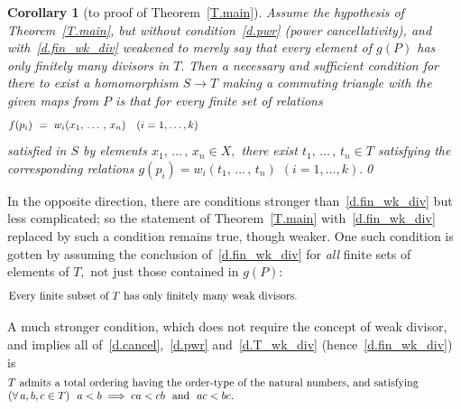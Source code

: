 \documentclass{amsart}
\newtheorem{corollary}[theorem]{Corollary}
\numberwithin{equation}{section}
\numberwithin{theorem}{section}
\newcommand{\2}{\mathbf{2}}
\begin{document}
\begin{corollary}[to proof of Theorem~\ref{T.main}]\label{C.varThm}
Assume the hypothesis of Theorem~\ref{T.main}, but without
condition~\eqref{d.pwr} {\rm(}power cancellativity{\rm)}, and
with~\eqref{d.fin_wk_div} weakened to
merely say that every element of $g(P)$ has only
finitely many divisors in $T.$
Then a necessary and sufficient condition
for there to exist a homomorphism $S\to T$ making a commuting
triangle with the given maps
from $P$ is that for every {\em finite set} of relations
%
\begin{equation}\begin{minipage}[c]{35pc}\label{d.fpi=wi}
$f(p_i)\ =\ w_i(x_1,\,\dots\,,\,x_n)$\hspace{1em}$(i=1,\dots,k)$
\end{minipage}\end{equation}
%
satisfied in $S$ by elements $x_1,\,\dots\,,\,x_n\in X,$ there
exist $t_1,\,\dots\,,\,t_n\in T$ satisfying the corresponding
relations $g(p_i)=w_i(t_1,\,\dots\,,\,t_n)$ $(i=1,\dots,k).$\qed
\end{corollary}

In the opposite direction, there are conditions stronger
than~\eqref{d.fin_wk_div} but less complicated; so
the statement of Theorem~\ref{T.main} with~\eqref{d.fin_wk_div}
replaced by such a condition remains true, though weaker.
One such condition is gotten by assuming the
conclusion of~\eqref{d.fin_wk_div} for {\em all} finite sets
of elements of $T,$ not just those contained in $g(P):$
%
\begin{equation}\begin{minipage}[c]{35pc}\label{d.T_wk_div}
Every finite subset of $T$ has only finitely many weak divisors.
\end{minipage}\end{equation}

A much stronger condition, which does not require the
concept of weak divisor, and implies all
of~\eqref{d.cancel},~\eqref{d.pwr} and~\eqref{d.T_wk_div}
(hence~\eqref{d.fin_wk_div}) is
%
\begin{equation}\begin{minipage}[c]{35pc}\label{d.ord_like_N}
$T$ admits a total ordering having the order-type of the
natural numbers, and satisfying\\
$(\forall\,a, b, c\in T)\ \ a < b \implies
ca < cb$ \ and \ $ac < bc.$
\end{minipage}\end{equation}
\end{document}

